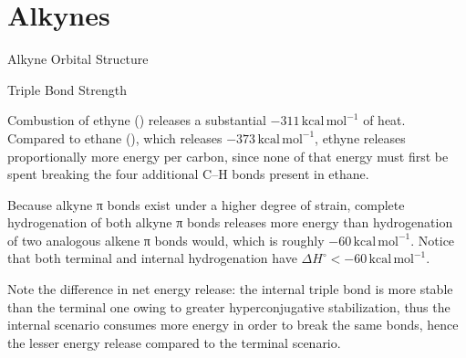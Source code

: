 \documentclass[10pt]{article}
\begin{document}
\section{Alkynes}
  \label{sec:alkynes}

  \begin{core}{Alkyne Orbital Structure}


  \end{core}

  \begin{core}{Triple Bond Strength}

    Combustion of ethyne () releases a substantial $-311\,\text{kcal}\,\text{mol}^{-1}$ of heat. Compared to ethane (), which releases $-373\,\text{kcal}\,\text{mol}^{-1}$, ethyne releases proportionally more energy per carbon, since none of that energy must first be spent breaking the four additional C--H bonds present in ethane.



    Because alkyne π bonds exist under a higher degree of strain, complete hydrogenation of both alkyne π bonds releases more energy than hydrogenation of two analogous alkene π bonds would, which is roughly $-60\,\text{kcal}\,\text{mol}^{-1}$. Notice that both terminal and internal hydrogenation have $ΔH^{\circ} < -60\,\text{kcal}\,\text{mol}^{-1}$.



    Note the difference in net energy release: the internal triple bond is more stable than the terminal one owing to greater hyperconjugative stabilization, thus the internal scenario consumes more energy in order to break the same bonds, hence the lesser energy release compared to the terminal scenario.

  \end{core}
\end{document}
